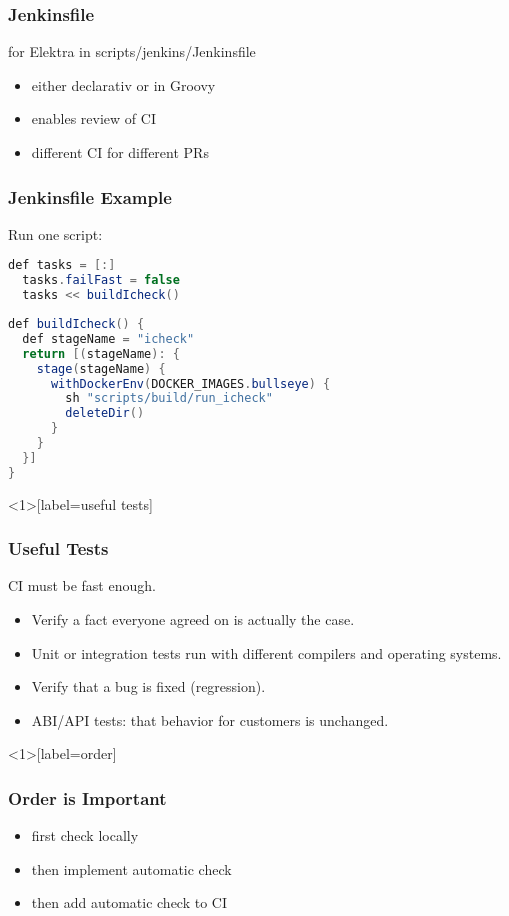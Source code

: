 \begin{frame}
	\frametitle{Jenkinsfile}

	for Elektra in scripts/jenkins/Jenkinsfile

	\begin{itemize}[<+-| alert@+>]

	\item either declarativ or in Groovy
	\item enables review of CI
	\item different CI for different PRs
	\end{itemize}
\end{frame}

\begin{frame}[fragile]
	\frametitle{Jenkinsfile Example}

	Run one script:
	\begin{lstlisting}[language=Java]
  def tasks = [:]
  tasks.failFast = false
  tasks << buildIcheck()
\end{lstlisting}

	\begin{lstlisting}[language=Java]
def buildIcheck() {
  def stageName = "icheck"
  return [(stageName): {
    stage(stageName) {
      withDockerEnv(DOCKER_IMAGES.bullseye) {
        sh "scripts/build/run_icheck"
        deleteDir()
      }
    }
  }]
}
\end{lstlisting}
\end{frame}

\begin{frame}<1>[label=useful tests]
	\frametitle{Useful Tests}

	\begin{problem}
	CI must be fast enough.
	\end{problem}

	\begin{itemize}[<+-| alert@+>]

	\item Verify a fact everyone agreed on is actually the case.
	\item Unit or integration tests run with different compilers and operating systems.
	\item Verify that a bug is fixed (regression).
	\item ABI/API tests: that behavior for customers is unchanged.
	\end{itemize}
\end{frame}

\begin{frame}<1>[label=order]
	\frametitle{Order is Important}

	\begin{itemize}[<+-| alert@+>]

	\item first check locally
	\item then implement automatic check
	\item then add automatic check to CI
	\end{itemize}
\end{frame}

